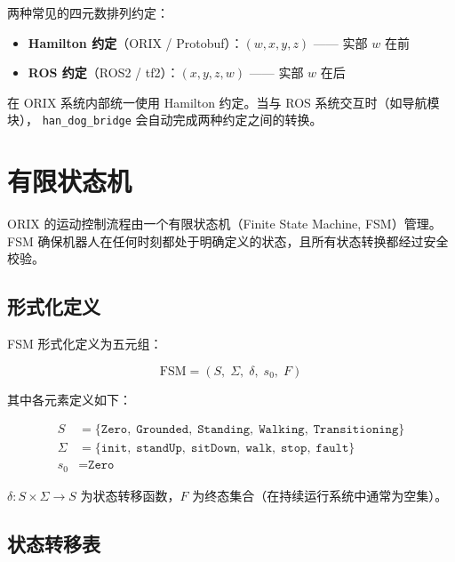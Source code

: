 \documentclass[a4paper,11pt,openany]{book}
\begin{document}
两种常见的四元数排列约定：

\begin{itemize}[nosep]
  \item \textbf{Hamilton 约定}（ORIX / Protobuf）：$(w, x, y, z)$ —— 实部 $w$ 在前
  \item \textbf{ROS 约定}（ROS2 / tf2）：$(x, y, z, w)$ —— 实部 $w$ 在后
\end{itemize}

在 ORIX 系统内部统一使用 Hamilton 约定。当与 ROS 系统交互时（如导航模块），
\texttt{han\_dog\_bridge} 会自动完成两种约定之间的转换。

\section{有限状态机}
\label{sec:fsm-theory}

ORIX 的运动控制流程由一个有限状态机（Finite State Machine, FSM）管理。
FSM 确保机器人在任何时刻都处于明确定义的状态，且所有状态转换都经过安全校验。

\subsection{形式化定义}

FSM 形式化定义为五元组：

\begin{equation}
\mathrm{FSM} = (S,\; \Sigma,\; \delta,\; s_0,\; F)
\end{equation}

其中各元素定义如下：

\begin{align}
S      &= \{\texttt{Zero},\; \texttt{Grounded},\; \texttt{Standing},\; \texttt{Walking},\; \texttt{Transitioning}\} \\
\Sigma &= \{\texttt{init},\; \texttt{standUp},\; \texttt{sitDown},\; \texttt{walk},\; \texttt{stop},\; \texttt{fault}\} \\
s_0    &= \texttt{Zero}
\end{align}

$\delta: S \times \Sigma \to S$ 为状态转移函数，$F$ 为终态集合（在持续运行系统中通常为空集）。

\subsection{状态转移表}
\end{document}

